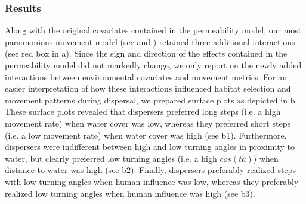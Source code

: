 \documentclass[abstract=on,10pt,a4paper,bibliography=totocnumbered]{scrartcl}
\begin{document}
\newpage
\subsubsection{Results}
Along with the original covariates contained in the permeability model, our most
parsimonious movement model (see  and
) retained three additional interactions (see red box
in a). Since the sign and direction of the effects contained
in the permeability model did not markedly change, we only report on the newly
added interactions between environmental covariates and movement metrics. For an
easier interpretation of how these interactions influenced habitat selection and
movement patterns during dispersal, we prepared surface plots as depicted in
b. These surface plots revealed that dispersers preferred
long steps (i.e. a high movement rate) when water cover was low, whereas they
preferred short steps (i.e. a low movement rate) when water cover was high (see
b1). Furthermore, dispersers were indifferent between high
and low turning angles in proximity to water, but clearly preferred low turning
angles (i.e. a high \(cos(ta)\)) when distance to water was high (see
b2). Finally, dispersers preferably realized steps with low
turning angles when human influence was low, whereas they preferably realized
low turning angles when human influence was high (see b3).
\end{document}
